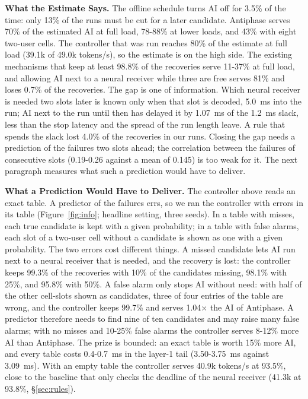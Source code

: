 \documentclass[acmsmall,screen,review,anonymous]{acmart}
\newcommand{\sys}{Antiphase\xspace}
\begin{document}
\noindent\textbf{What the Estimate Says.} The offline schedule turns AI off for 3.5\% of
the time: only 13\% of the runs must be cut for a later candidate. \sys serves 70\% of the estimated AI
at full load, 78-88\% at lower loads, and 43\% with eight two-user cells. The controller that was run
reaches 80\% of the estimate at full load (39.1k of 49.0k tokens/s), so the estimate is on the high side. The existing mechanisms that keep
at least 98.8\% of the recoveries serve 11-37\% at full load, and allowing AI next to a neural receiver
while three are free serves 81\% and loses 0.7\% of the recoveries. The gap is one of information. Which
neural receiver is needed two slots later is known only when that slot is decoded, 5.0~ms into the run; AI
next to the run until then has delayed it by 1.07~ms of the 1.2~ms slack, less than the stop latency and the
spread of the run length leave. A rule that spends the slack lost 4.0\% of the recoveries in our runs.
Closing the gap needs a prediction of the failures two slots ahead; the correlation between the failures of
consecutive slots (0.19-0.26 against a mean of 0.145) is too weak for it. The next paragraph measures what
such a prediction would have to deliver.

\noindent\textbf{What a Prediction Would Have to Deliver.} The controller above reads an exact table. A
predictor of the failures errs, so we ran the controller with errors in its table (Figure~\ref{fig:info};
headline setting, three seeds). In a table with misses, each true candidate is kept with a given
probability; in a table with false alarms, each slot of a two-user cell without a candidate is shown as one
with a given probability. The two errors cost different things. A missed candidate lets AI run next to a
neural receiver that is needed, and the recovery is lost: the controller keeps 99.3\% of the recoveries
with 10\% of the candidates missing, 98.1\% with 25\%, and 95.8\% with 50\%. A false alarm only stops AI
without need: with half of the other cell-slots shown as candidates, three of four entries of the table
are wrong, and the controller keeps 99.7\% and serves 1.04$\times$ the AI of \sys. A predictor therefore
needs to find nine of ten candidates and may raise many false alarms; with no misses and 10-25\% false
alarms the controller serves 8-12\% more AI than \sys. The prize is bounded: an exact table is worth 15\%
more AI, and every table costs 0.4-0.7~ms in the layer-1 tail (3.50-3.75~ms against 3.09~ms). With an
empty table the controller serves 40.9k tokens/s at 93.5\%, close to the baseline that only checks the
deadline of the neural receiver (41.3k at 93.8\%, \S\ref{sec:rules}).
\end{document}
